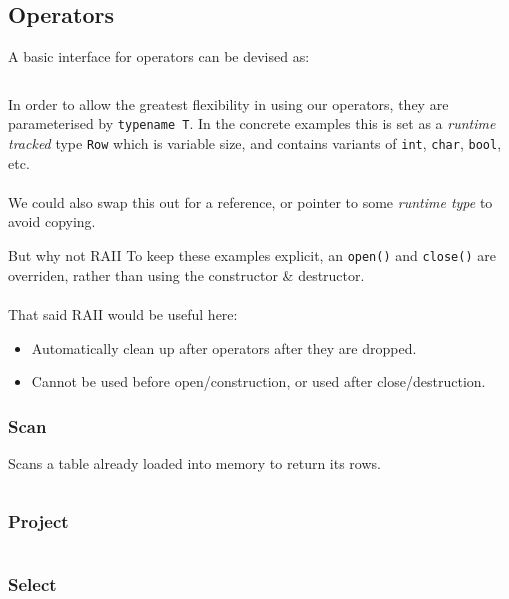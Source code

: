 \subsection{Operators}
A basic interface for operators can be devised as:
\inputminted[firstline=14, lastline=18]{cpp}{processing_models/code/volcano/operators.h}
In order to allow the greatest flexibility in using our operators, they are parameterised by \texttt{typename T}.
In the concrete examples this is set as a \textit{runtime tracked} type \texttt{Row} which is variable size, and contains variants of \texttt{int}, \texttt{char}, \texttt{bool}, etc.
\\
\\ We could also swap this out for a reference, or pointer to some \textit{runtime type} to avoid copying.

\begin{sidenotebox}{But why not RAII}
  To keep these examples explicit, an \texttt{open()} and \texttt{close()} are overriden, rather than using the constructor \& destructor.
  \\
  \\ That said RAII would be useful here:
  \begin{itemize}
    \item Automatically clean up after operators after they are dropped.
    \item Cannot be used before open/construction, or used after close/destruction.
  \end{itemize}
\end{sidenotebox}

\subsubsection{Scan}
Scans a table already loaded into memory to return its rows.
\inputminted[firstline=20, lastline=38]{cpp}{processing_models/code/volcano/operators.h}

\subsubsection{Project}
\inputminted[firstline=45, lastline=65]{cpp}{processing_models/code/volcano/operators.h}

\subsubsection{Select}
\inputminted[firstline=72, lastline=90]{cpp}{processing_models/code/volcano/operators.h}

